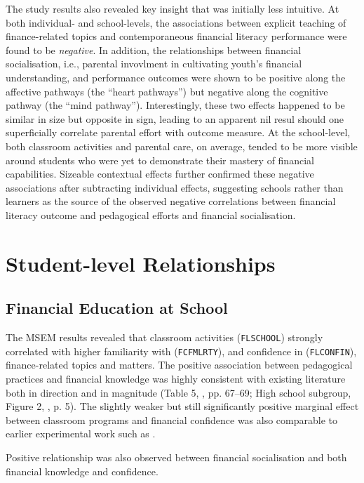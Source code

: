 \documentclass[a4paper,11pt,UKenglish,twoside,openright]{report}\usepackage[]{graphicx}\usepackage[]{color}
\begin{document}
The study results also revealed key insight that was initially less intuitive. At both individual- and school-levels, the associations between explicit teaching of finance-related topics and contemporaneous financial literacy performance were found to be \emph{negative}. In addition, the relationships between financial socialisation, i.e., parental invovlment in cultivating youth's financial understanding, and performance outcomes were shown to be positive along the affective pathways (the ``heart pathways'') but negative along the cognitive pathway (the ``mind pathway''). Interestingly, these two effects happened to be similar in size but opposite in sign, leading to an apparent nil resul should one superficially correlate parental effort with outcome measure. At the school-level, both classroom activities and parental care, on average, tended to be more visible around students who were yet to demonstrate their mastery of financial capabilities. Sizeable contextual effects further confirmed these negative associations after subtracting individual effects, suggesting schools rather than learners as the source of the observed negative correlations between financial literacy outcome and pedagogical efforts and financial socialisation.

\section{Student-level Relationships}

\subsection{Financial Education at School}

The MSEM results revealed that classroom activities (\texttt{FLSCHOOL}) strongly correlated with higher familiarity with (\texttt{FCFMLRTY}), and confidence in (\texttt{FLCONFIN}), finance-related topics and matters. The positive association between pedagogical practices and financial knowledge was highly consistent with existing literature both in direction and in magnitude (Table 5, \textcite{amagir:2018}, pp. 67--69; High school subgroup, Figure 2, \textcite{kaiser:2020}, p. 5). The slightly weaker but still significantly positive marginal effect between classroom programs and financial confidence was also comparable to earlier experimental work such as \textcite{luhrmann:2015}.

Positive relationship was also observed between financial socialisation and both financial knowledge and confidence.
\end{document}
